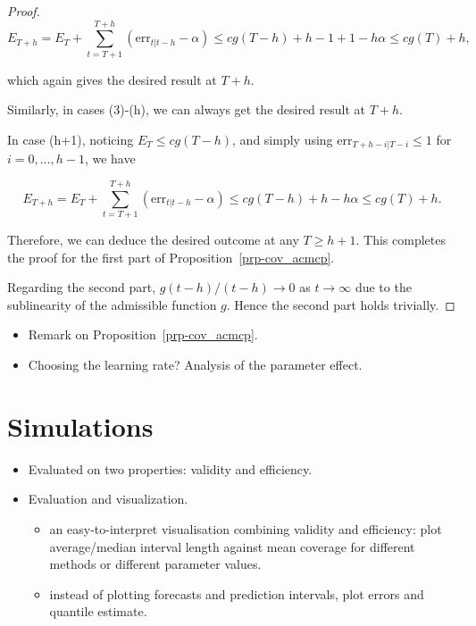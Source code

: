 \documentclass[
  11pt,
  a4paper,
]{article}
\theoremstyle{plain}
\theoremstyle{plain}
\theoremstyle{remark}
\begin{document}
\begin{proof}
\[
E_{T+h} = E_T+\sum_{t=T+1}^{T+h}(\mathrm{err}_{t|t-h}-\alpha) \leq cg(T-h)+h-1+1-h\alpha \leq cg(T)+h,
\]

which again gives the desired result at \(T+h\).

Similarly, in cases (3)-(h), we can always get the desired result at
\(T+h\).

In case (h+1), noticing \(E_T \leq cg(T-h)\), and simply using
\(\mathrm{err}_{T+h-i|T-i} \leq 1\) for \(i=0,\ldots,h-1\), we have

\[
E_{T+h} = E_T+\sum_{t=T+1}^{T+h}(\mathrm{err}_{t|t-h}-\alpha) \leq cg(T-h)+h-h\alpha \leq cg(T)+h.
\]

Therefore, we can deduce the desired outcome at any \(T \geq h+1\). This
completes the proof for the first part of
Proposition~\ref{prp-cov_acmcp}.

Regarding the second part, \(g(t-h)/(t-h) \rightarrow 0\) as
\(t \rightarrow \infty\) due to the sublinearity of the admissible
function \(g\). Hence the second part holds trivially.
\end{proof}

\begin{itemize}
\item
  Remark on Proposition~\ref{prp-cov_acmcp}.
\item
  Choosing the learning rate? Analysis of the parameter effect.
\end{itemize}

\section{Simulations}\label{simulations}

\begin{itemize}
\item
  Evaluated on two properties: validity and efficiency.
\item
  Evaluation and visualization.

  \begin{itemize}
  \item
    an easy-to-interpret visualisation combining validity and
    efficiency: plot average/median interval length against mean
    coverage for different methods or different parameter values.
  \item
    instead of plotting forecasts and prediction intervals, plot errors
    and quantile estimate.
  \end{itemize}
\end{itemize}
\end{document}
